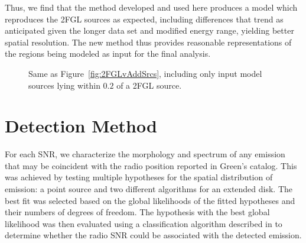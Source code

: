 Thus, we find that the method developed and used here produces a model which reproduces the 2FGL sources as expected, including differences that trend as anticipated given the longer data set and modified energy range, yielding better spatial resolution. The new method thus provides reasonable representations of the regions being modeled as input for the final analysis.

\begin{figure}[h!]
	\centering
	\caption[Same as Figure~\ref{fig:2FGLvAddSrcs}, including only input model sources lying within $0.2$\degr{} of a 2FGL source.]{Same as Figure~\ref{fig:2FGLvAddSrcs}, including only input model sources lying within $0.2$\degr{} of a 2FGL source.}
	\label{fig:2FGLvAddSrcsAssoc} 
\end{figure}


\section{Detection Method}\label{snrcat:DetectMethod}

For each SNR, we characterize the morphology and spectrum of any \gam{} emission that may be coincident with the radio position reported in Green's catalog. This was achieved by testing multiple hypotheses for the spatial distribution of \gam{} emission: a point source and two different algorithms for an extended disk. The best fit was selected based on the global likelihoods of the fitted hypotheses and their numbers of degrees of freedom. The hypothesis with the best global likelihood was then evaluated using a classification algorithm described in \cite{snrCat} to determine whether the radio SNR could be associated with the detected \gam{} emission. 

